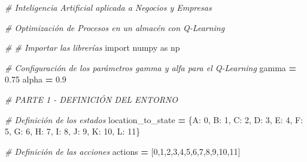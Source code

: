 \documentclass[
]{book}
\newenvironment{Shaded}{\begin{snugshade}}{\end{snugshade}}
\newcommand{\CommentTok}[1]{\textcolor[rgb]{0.56,0.35,0.01}{\textit{#1}}}
\newcommand{\DecValTok}[1]{\textcolor[rgb]{0.00,0.00,0.81}{#1}}
\newcommand{\FloatTok}[1]{\textcolor[rgb]{0.00,0.00,0.81}{#1}}
\newcommand{\ImportTok}[1]{#1}
\newcommand{\NormalTok}[1]{#1}
\newcommand{\OperatorTok}[1]{\textcolor[rgb]{0.81,0.36,0.00}{\textbf{#1}}}
\newcommand{\StringTok}[1]{\textcolor[rgb]{0.31,0.60,0.02}{#1}}
\begin{document}
\begin{Shaded}
\begin{Highlighting}[]
\CommentTok{\# Inteligencia Artificial aplicada a Negocios y Empresas}

\CommentTok{\# Optimización de Procesos en un almacén con Q{-}Learning}

\CommentTok{\# \# Importar las librerías}
\ImportTok{import}\NormalTok{ numpy }\ImportTok{as}\NormalTok{ np}

\CommentTok{\# Configuración de los parámetros gamma y alfa para el Q{-}Learning}
\NormalTok{gamma }\OperatorTok{=} \FloatTok{0.75}
\NormalTok{alpha }\OperatorTok{=} \FloatTok{0.9}

\CommentTok{\# PARTE 1 {-} DEFINICIÓN DEL ENTORNO}

\CommentTok{\# Definición de los estados}
\NormalTok{location\_to\_state }\OperatorTok{=}\NormalTok{ \{}\StringTok{\textquotesingle{}A\textquotesingle{}}\NormalTok{: }\DecValTok{0}\NormalTok{,}
                     \StringTok{\textquotesingle{}B\textquotesingle{}}\NormalTok{: }\DecValTok{1}\NormalTok{,}
                     \StringTok{\textquotesingle{}C\textquotesingle{}}\NormalTok{: }\DecValTok{2}\NormalTok{,}
                     \StringTok{\textquotesingle{}D\textquotesingle{}}\NormalTok{: }\DecValTok{3}\NormalTok{,}
                     \StringTok{\textquotesingle{}E\textquotesingle{}}\NormalTok{: }\DecValTok{4}\NormalTok{,}
                     \StringTok{\textquotesingle{}F\textquotesingle{}}\NormalTok{: }\DecValTok{5}\NormalTok{,}
                     \StringTok{\textquotesingle{}G\textquotesingle{}}\NormalTok{: }\DecValTok{6}\NormalTok{,}
                     \StringTok{\textquotesingle{}H\textquotesingle{}}\NormalTok{: }\DecValTok{7}\NormalTok{,}
                     \StringTok{\textquotesingle{}I\textquotesingle{}}\NormalTok{: }\DecValTok{8}\NormalTok{,}
                     \StringTok{\textquotesingle{}J\textquotesingle{}}\NormalTok{: }\DecValTok{9}\NormalTok{,}
                     \StringTok{\textquotesingle{}K\textquotesingle{}}\NormalTok{: }\DecValTok{10}\NormalTok{,}
                     \StringTok{\textquotesingle{}L\textquotesingle{}}\NormalTok{: }\DecValTok{11}\NormalTok{\}}

\CommentTok{\# Definición de las acciones}
\NormalTok{actions }\OperatorTok{=}\NormalTok{ [}\DecValTok{0}\NormalTok{,}\DecValTok{1}\NormalTok{,}\DecValTok{2}\NormalTok{,}\DecValTok{3}\NormalTok{,}\DecValTok{4}\NormalTok{,}\DecValTok{5}\NormalTok{,}\DecValTok{6}\NormalTok{,}\DecValTok{7}\NormalTok{,}\DecValTok{8}\NormalTok{,}\DecValTok{9}\NormalTok{,}\DecValTok{10}\NormalTok{,}\DecValTok{11}\NormalTok{]}


\end{Highlighting}
\end{Shaded}
\end{document}
